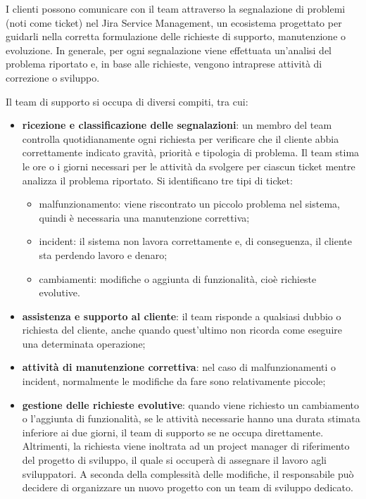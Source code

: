    I clienti possono comunicare con il team attraverso la segnalazione di problemi (noti come ticket) nel Jira Service Management, un ecosistema progettato per
    guidarli nella corretta formulazione delle richieste di supporto, manutenzione o evoluzione. In generale, per ogni segnalazione viene effettuata un'analisi
    del problema riportato e, in base alle richieste, vengono intraprese attività di correzione o sviluppo.

    Il team di supporto si occupa di diversi compiti, tra cui:
    \begin{itemize}
        \item \textbf{ricezione e classificazione delle segnalazioni}: un membro del team controlla quotidianamente ogni richiesta per verificare che il cliente abbia correttamente indicato gravità,
        priorità e tipologia di problema. Il team stima le ore o i giorni necessari per le attività da svolgere per ciascun ticket mentre analizza il problema riportato. Si identificano tre tipi di ticket: 
            \begin{itemize}
                \item malfunzionamento: viene riscontrato un piccolo problema nel sistema, quindi è necessaria una manutenzione correttiva;
                \item incident: il sistema non lavora correttamente e, di conseguenza, il cliente sta perdendo lavoro e denaro;
                \item cambiamenti: modifiche o aggiunta di funzionalità, cioè richieste evolutive.
            \end{itemize}
        \item \textbf{assistenza e supporto al cliente}: il team risponde a qualsiasi dubbio o richiesta del cliente, anche quando quest'ultimo non ricorda come eseguire una determinata operazione;
        \item \textbf{attività di manutenzione correttiva}: nel caso di malfunzionamenti o incident, normalmente le modifiche da fare sono relativamente piccole;
        \item \textbf{gestione delle richieste evolutive}: quando viene richiesto un cambiamento o l'aggiunta di funzionalità, se le attività necessarie hanno
        una durata stimata inferiore ai due giorni, il team di supporto se ne occupa direttamente. Altrimenti, la richiesta viene inoltrata ad un project manager di
        riferimento del progetto di sviluppo, il quale si occuperà di assegnare il lavoro agli sviluppatori. A seconda della complessità delle modifiche, il responsabile
        può decidere di organizzare un nuovo progetto con un team di sviluppo dedicato.        
    \end{itemize}

